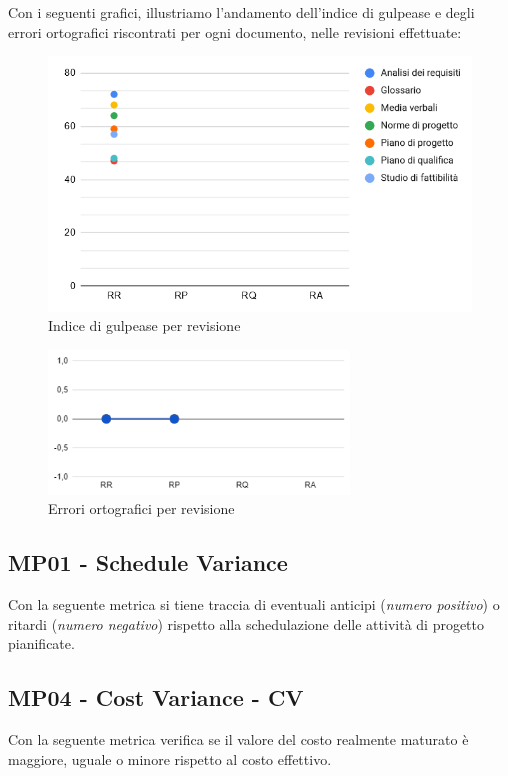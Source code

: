 \noindent Con i seguenti grafici, illustriamo l'andamento dell'indice di gulpease e degli errori ortografici riscontrati per ogni documento, nelle revisioni effettuate:
\begin{figure}[H]
	\centering
	\includegraphics[width=12cm]{images/gulpease.png}
	\caption{Indice di gulpease per revisione}
\end{figure}
\begin{figure}[H]
	\centering
	\includegraphics[width=8cm]{images/err_ortografici.png}
	\caption{Errori ortografici per revisione}
\end{figure}

\subsection{MP01 - Schedule Variance}
Con la seguente metrica si tiene traccia di eventuali anticipi (\textit{numero positivo}) o ritardi (\textit{numero negativo}) rispetto alla schedulazione delle attività di progetto pianificate.

\subsection{MP04 - Cost Variance - CV}
Con la seguente metrica verifica se il valore del costo realmente maturato è maggiore, uguale o minore rispetto al costo effettivo.

